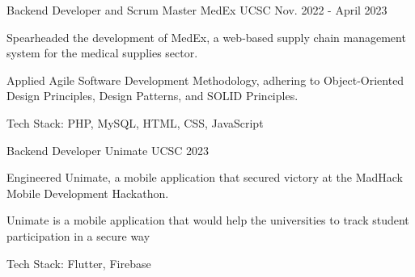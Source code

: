 \begin{cventries}
    \cventry
    {Backend Developer and Scrum Master} %
    {MedEx \href{https://github.com/kulasinghet/MedEx}{\faGithubSquare}} %
    {UCSC} %
    {Nov. 2022 - April 2023} %
    {
        \begin{cvitems} %
            \item {Spearheaded the development of MedEx, a web-based supply chain management system for the medical supplies sector.}
            \item {Applied Agile Software Development Methodology, adhering to Object-Oriented Design Principles, Design Patterns, and SOLID Principles.}
            \item {Tech Stack: PHP, MySQL, HTML, CSS, JavaScript}
        \end{cvitems}
    }

    \cventry
    {Backend Developer } %
    {Unimate \href{https://github.com/kulasinghet/unimate}{\faGithubSquare}} %
    {UCSC} %
    {2023} %
    {
        \begin{cvitems} %
            \item {Engineered Unimate, a mobile application that secured victory at the MadHack Mobile Development Hackathon.}
            \item {Unimate is a mobile application that would help the universities to track student participation in a secure way}
            \item {Tech Stack: Flutter, Firebase}
        \end{cvitems}
    }
\end{cventries}
